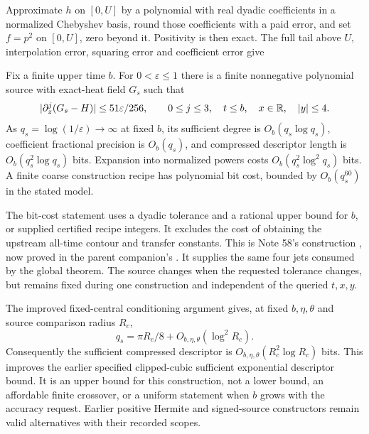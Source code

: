 Approximate $h$ on $[0,U]$ by a polynomial with real dyadic coefficients
in a normalized Chebyshev basis, round those coefficients with a paid
error, and set $f=p^2$ on $[0,U]$, zero beyond it. Positivity is then
exact. The full tail above $U$, interpolation error, squaring error
and coefficient error give
\begin{theorem}
\label{thm:source-compression}
Fix a finite upper time $b$. For $0<\varepsilon\le1$ there is a
finite nonnegative polynomial source with exact-heat field $G_s$ such that
\begin{equation}
 |\partial_z^j(G_s-H)|\le51\varepsilon/256,
 \qquad0\le j\le3,\quad t\le b,\quad x\in\mathbb R,\quad |y|\le4.
 \label{eq:source-four-jets}
\end{equation}
As $q_s=\log(1/\varepsilon)\to\infty$ at fixed $b$, its sufficient
degree is $O_b(q_s\log q_s)$, coefficient fractional precision is
$O_b(q_s)$, and compressed descriptor length is
$O_b(q_s^2\log q_s)$ bits. Expansion into normalized powers costs
$O_b(q_s^2\log^2q_s)$ bits. A finite coarse construction recipe has
polynomial bit cost, bounded by $O_b(q_s^{60})$ in the stated model.
\end{theorem}
The bit-cost statement uses a dyadic tolerance and a rational upper bound
for $b$, or supplied certified recipe integers. It excludes the cost of
obtaining the upstream all-time contour and transfer constants.
This is Note 58's construction \cite{compression}, now proved in the
parent companion's . It supplies the
same four jets consumed by the global theorem. The source changes
when the requested tolerance changes, but remains fixed during one
construction and independent of the queried $t,x,y$.

The improved fixed-central conditioning argument gives, at fixed
$b,\eta,\theta$ and source comparison radius $R_c$,
\begin{equation}
 q_s=\pi R_c/8+O_{b,\eta,\theta}(\log^2R_c).
 \label{eq:source-demand}
\end{equation}
Consequently the sufficient compressed descriptor is
$O_{b,\eta,\theta}(R_c^2\log R_c)$ bits. This improves the earlier
specified clipped-cubic sufficient exponential descriptor bound.
It is an upper bound for this construction, not a lower bound,
an affordable finite crossover, or a uniform statement when $b$ grows
with the accuracy request. Earlier positive Hermite and signed-source
constructors remain valid alternatives with their recorded scopes.

